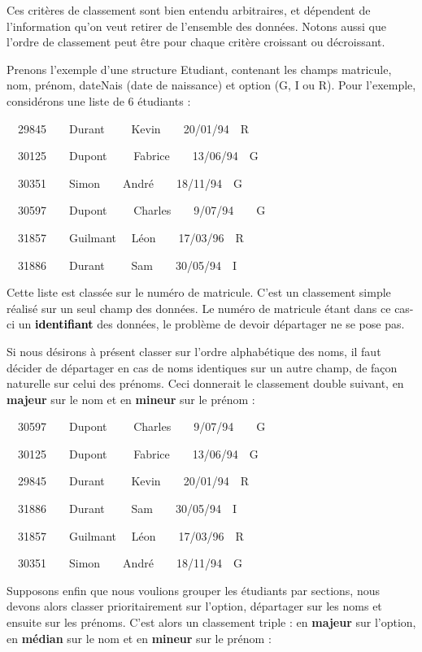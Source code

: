 Ces critères de classement sont bien entendu arbitraires, et dépendent
de l’information qu’on veut retirer de l’ensemble des données. Notons
aussi que l’ordre de classement peut être pour chaque critère croissant
ou décroissant.

Prenons l’exemple d’une structure Etudiant, contenant les champs
matricule, nom, prénom, dateNais (date de naissance) et option (G, I ou
R). Pour l’exemple, considérons une liste de 6 étudiants :

{\ \ \textsf{29845\ \ \ \ Durant \ \ \ \ Kevin\ \ \ \ 20/01/94\ \ R}}

{\sffamily 
\ \ 30125\ \ \ \ Dupont \ \ \ \ Fabrice\ \ \ \ 13/06/94\ \ G}

{\sffamily
\ \ 30351\ \ \ \ Simon\ \ \ \ André\ \ \ \ 18/11/94\ \ G}

{\sffamily
\ \ 30597\ \ \ \ Dupont \ \ \ \ Charles\ \ \ \ 9/07/94\ \ \ \ G}

{\sffamily
\ \ 31857\ \ \ \ Guilmant \ \ Léon\ \ \ \ 17/03/96\ \ R}

{\sffamily
\ \ 31886\ \ \ \ Durant \ \ \ \ Sam\ \ \ \ 30/05/94\ \ I}


Cette liste est classée sur le numéro de matricule. C’est un classement
simple réalisé sur un seul champ des données. Le numéro de matricule
étant dans ce cas-ci un \textbf{\textcolor{black}{identifiant}} des
données, le problème de devoir départager ne se pose pas.

Si nous désirons à présent classer sur l’ordre alphabétique des noms, il
faut décider de départager en cas de noms identiques sur un autre
champ, de façon naturelle sur celui des prénoms. Ceci donnerait le
classement double suivant, en \textbf{majeur} sur le nom et en
\textbf{mineur} sur le prénom :

{\sffamily
\ \ 30597\ \ \ \ Dupont \ \ \ \ Charles\ \ \ \ 9/07/94\ \ \ \ G}

{\sffamily
\ \ 30125\ \ \ \ Dupont \ \ \ \ Fabrice\ \ \ \ 13/06/94\ \ G}

{\sffamily
\ \ 29845\ \ \ \ Durant \ \ \ \ Kevin\ \ \ \ 20/01/94\ \ R}

{\sffamily
\ \ 31886\ \ \ \ Durant \ \ \ \ Sam\ \ \ \ 30/05/94\ \ I}

{\sffamily
\ \ 31857\ \ \ \ Guilmant \ \ Léon\ \ \ \ 17/03/96\ \ R}

{\sffamily
\ \ 30351\ \ \ \ Simon\ \ \ \ André\ \ \ \ 18/11/94\ \ G}


Supposons enfin que nous voulions grouper les étudiants par sections,
nous devons alors classer prioritairement sur l’option, départager sur
les noms et ensuite sur les prénoms. C’est alors un classement triple :
en \textbf{majeur} sur l’option, en \textbf{médian} sur le nom et en
\textbf{mineur} sur le prénom : 

